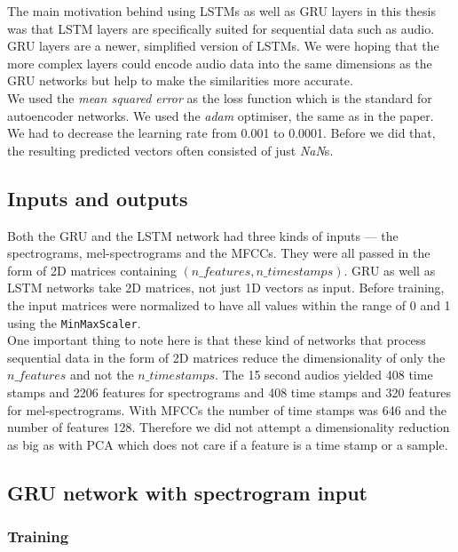 The main motivation behind using LSTMs as well as GRU layers in this thesis was that LSTM layers are specifically suited for sequential data such as audio. GRU layers are a newer, simplified version of LSTMs. We were hoping that the more complex layers could encode audio data into the same dimensions as the GRU networks but help to make the similarities more accurate. \\

We used the \textit{mean squared error} as the loss function which is the standard for autoencoder networks. We used the \textit{adam} optimiser, the same as in the \cite{inproceedings_RNNs} paper. We had to decrease the learning rate from 0.001 to 0.0001. Before we did that, the resulting predicted vectors often consisted of just \textit{NaN}s.

\subsection{Inputs and outputs}
Both the GRU and the LSTM network had three kinds of inputs --- the spectrograms, mel-spectrograms and the MFCCs. They were all passed in the form of 2D matrices containing $(n\_features, n\_timestamps)$. GRU as well as LSTM networks take 2D matrices, not just 1D vectors as input. Before training, the input matrices were normalized to have all values within the range of 0 and 1 using the \texttt{MinMaxScaler}. \\
One important thing to note here is that these kind of networks that process sequential data in the form of 2D matrices reduce the dimensionality of only the $ n\_features $ and not the $ n\_timestamps $. The 15 second audios yielded 408 time stamps and 2206 features for spectrograms and 408 time stamps and 320 features for mel-spectrograms. With MFCCs the number of time stamps was 646 and the number of features 128. Therefore we did not attempt a dimensionality reduction as big as with PCA which does not care if a feature is a time stamp or a sample. 

\subsection{GRU network with spectrogram input}\label{ssec:GRU_spec_experiments}

\subsubsection{Training}

